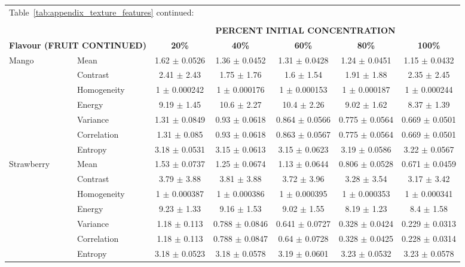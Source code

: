 \documentclass[authoryear]{elsarticle}
\begin{document}
	\begin{tabular}{llccccc}
	\multicolumn{4}{l}{Table~\ref{tab:appendix_texture_features} continued:}\\ 
	\multicolumn{4}{c}{}\\ 
	\toprule
    \multicolumn{1}{r}{} & & \multicolumn{5}{c}{\textbf{PERCENT INITIAL CONCENTRATION}} \\
		\multicolumn{2}{l}{\textbf{Flavour (FRUIT CONTINUED)}} & \textbf{20\%} & \textbf{40\%} & \textbf{60\%} & \textbf{80\%} & \textbf{100\%} \\	
 \midrule 
Mango & Mean & 1.62 $\pm$ 0.0526 & 1.36 $\pm$ 0.0452 & 1.31 $\pm$ 0.0428 & 1.24 $\pm$ 0.0451 & 1.15 $\pm$ 0.0432 \\ 
& Contrast & 2.41 $\pm$ 2.43 & 1.75 $\pm$ 1.76 & 1.6 $\pm$ 1.54 & 1.91 $\pm$ 1.88 & 2.35 $\pm$ 2.45 \\ 
& Homogeneity & 1 $\pm$ 0.000242 & 1 $\pm$ 0.000176 & 1 $\pm$ 0.000153 & 1 $\pm$ 0.000187 & 1 $\pm$ 0.000244 \\ 
& Energy & 9.19 $\pm$ 1.45 & 10.6 $\pm$ 2.27 & 10.4 $\pm$ 2.26 & 9.02 $\pm$ 1.62 & 8.37 $\pm$ 1.39 \\ 
& Variance & 1.31 $\pm$ 0.0849 & 0.93 $\pm$ 0.0618 & 0.864 $\pm$ 0.0566 & 0.775 $\pm$ 0.0564 & 0.669 $\pm$ 0.0501 \\ 
& Correlation & 1.31 $\pm$ 0.085 & 0.93 $\pm$ 0.0618 & 0.863 $\pm$ 0.0567 & 0.775 $\pm$ 0.0564 & 0.669 $\pm$ 0.0501 \\ 
& Entropy & 3.18 $\pm$ 0.0531 & 3.15 $\pm$ 0.0613 & 3.15 $\pm$ 0.0623 & 3.19 $\pm$ 0.0586 & 3.22 $\pm$ 0.0567 \\ 
	\midrule 
Strawberry & Mean & 1.53 $\pm$ 0.0737 & 1.25 $\pm$ 0.0674 & 1.13 $\pm$ 0.0644 & 0.806 $\pm$ 0.0528 & 0.671 $\pm$ 0.0459 \\ 
& Contrast & 3.79 $\pm$ 3.88 & 3.81 $\pm$ 3.88 & 3.72 $\pm$ 3.96 & 3.28 $\pm$ 3.54 & 3.17 $\pm$ 3.42 \\ 
& Homogeneity & 1 $\pm$ 0.000387 & 1 $\pm$ 0.000386 & 1 $\pm$ 0.000395 & 1 $\pm$ 0.000353 & 1 $\pm$ 0.000341 \\ 
& Energy & 9.23 $\pm$ 1.33 & 9.16 $\pm$ 1.53 & 9.02 $\pm$ 1.55 & 8.19 $\pm$ 1.23 & 8.4 $\pm$ 1.58 \\ 
& Variance & 1.18 $\pm$ 0.113 & 0.788 $\pm$ 0.0846 & 0.641 $\pm$ 0.0727 & 0.328 $\pm$ 0.0424 & 0.229 $\pm$ 0.0313 \\ 
& Correlation & 1.18 $\pm$ 0.113 & 0.788 $\pm$ 0.0847 & 0.64 $\pm$ 0.0728 & 0.328 $\pm$ 0.0425 & 0.228 $\pm$ 0.0314 \\ 
& Entropy & 3.18 $\pm$ 0.0523 & 3.18 $\pm$ 0.0578 & 3.19 $\pm$ 0.0601 & 3.23 $\pm$ 0.0532 & 3.23 $\pm$ 0.0578 \\ 

\end{tabular}
\end{document}
